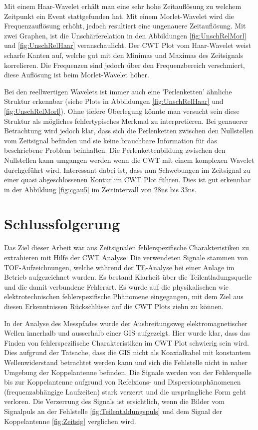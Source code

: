 \begin{refsection}
Mit einem Haar-Wavelet erhält man eine sehr hohe Zeitauflösung zu welchem Zeitpunkt ein Event stattgefunden hat.
Mit einem Morlet-Wavelet wird die Frequenzauflösung erhöht, jedoch resultiert eine ungenauere Zeitauflösung.
Mit zwei Graphen, ist die Unschärferelation in den Abbildungen \ref{fig:UnschRelMorl} und \ref{fig:UnschRelHaar} veranschaulicht. 
Der CWT Plot vom Haar-Wavelet weist scharfe Kanten auf, welche gut mit den Minimas und Maximas des Zeitsignals korrelieren.
Die Frequenzen sind jedoch über den Frequenzbereich verschmiert, diese Auflösung ist beim Morlet-Wavelet höher.

Bei den reellwertigen Wavelets ist immer auch eine 'Perlenketten' ähnliche Struktur erkennbar (siehe Plots in Abbildungen \ref{fig:UnschRelHaar} und \ref{fig:UnschRelMorl}).
Ohne tiefere Überlegung könnte man versucht sein diese Struktur als mögliches fehlertypisches Merkmal zu interpretieren. 
Bei genauerer Betrachtung wird jedoch klar, dass sich die Perlenketten zwischen den Nullstellen vom Zeitsignal befinden und sie keine brauchbare Information für das beschriebene Problem beinhalten.
Die Perlenkettenbildung zwischen den Nullstellen kann umgangen werden wenn die CWT mit einem komplexen Wavelet durchgeführt wird.
Interessant dabei ist, dass nun Schwebungen im Zeitsignal zu einer quasi abgeschlossenen Kontur im CWT Plot führen.
Dies ist gut erkennbar in der Abbildung \ref{fig:cgau5} im Zeitintervall von 28ns bis 33ns.

\section{Schlussfolgerung}
Das Ziel dieser Arbeit war aus Zeitsignalen fehlerspezifische Charakteristiken zu extrahieren mit Hilfe der CWT Analyse.
Die verwendeten Signale stammen von TOF-Aufzeichnungen, welche während der TE-Analyse bei einer Anlage im Betrieb aufgezeichnet wurden. Es bestand Klarheit über die Teilentladungsquelle und die damit verbundene Fehlerart. 
Es wurde auf die physikalischen wie elektrotechnischen fehlerspezifische Phänomene eingegangen, mit dem Ziel aus diesen Erkenntnissen Rückschlüsse auf die CWT Plots ziehn zu können.

In der Analyse des Messpfades wurde der Ausbreitungsweg elektromagnetischer Wellen innerhalb und ausserhalb einer GIS aufgezeigt.
Hier wurde klar, dass das Finden von fehlerspezifische Charakteristiken im CWT Plot schwierig sein wird.
Dies aufgrund der Tatsache, dass die GIS nicht als Koaxialkabel mit konstantem Wellenwiderstand betrachtet werden kann und sich die Fehlstelle nicht in naher Umgebung der Koppelantenne befinden.
Die Signale werden von der Fehlerquelle bis zur Koppelantenne aufgrund von Refelxions- und Dispersionsphänomenen (frequenzabhängige Laufzeiten) stark verzerrt und die ursprüngliche Form geht verloren.
Die Verzerrung des Signals ist ersichtlich, wenn die Bilder vom Signalpuls an der Fehlstelle \ref{fig:Teilentaldungspuls} und dem Signal der Koppelantenne \ref{fig:Zeitsig} verglichen wird.


\end{refsection}

